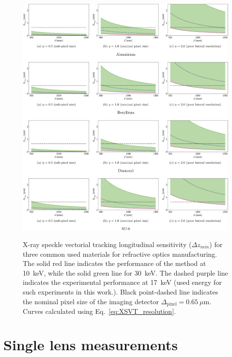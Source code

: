 \begin{refsection}
\begin{figure}[t]
        \centering
        {\includegraphics[width=1.0\linewidth]{figures/ch04b/sensitivity_2.pdf}}
        \caption[XSVT sensitivity calculation]{X-ray speckle vectorial tracking longitudinal sensitivity ($\Delta{z_{min}}$) for three common used materials for refractive optics manufacturing. The solid red line indicates the performance of the method at 10~keV, while the solid green line for 30~keV. The dashed purple line indicates the experimental performance at 17~keV (used energy for such experiments in this work.). Black point-dashed line indicates the nominal pixel size of the imaging detector $\Delta_\text{pixel}=0.65~\mu$m. Curves calculated using Eq.~\ref{eq:XSVT_resolution}.}\label{fig:sensitivity_2}
\end{figure}

\newpage
\newpage

\section{Single lens measurements}


\end{refsection}
